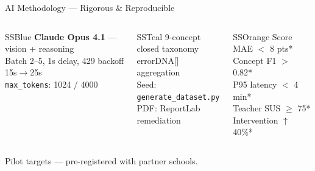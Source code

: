 \documentclass[aspectratio=169,10pt]{beamer}
\begin{document}
\begin{frame}{AI Methodology — Rigorous \& Reproducible}
  \begin{columns}[T]
    \begin{callout}[title={Model}]{SSBlue}
      \footnotesize
      \textbf{Claude Opus 4.1} — vision + reasoning\\
      Batch 2–5, 1s delay, 429 backoff 15s$\rightarrow$25s\\
      \texttt{max\_tokens}: 1024 / 4000
    \end{callout}
    \begin{callout}[title={Data}]{SSTeal}
      \footnotesize
      9-concept closed taxonomy\\
      errorDNA[] aggregation\\
      Seed: \texttt{generate\_dataset.py}\\
      PDF: ReportLab remediation
    \end{callout}
    \begin{callout}[title={Eval (8-wk pilot)}]{SSOrange}
      \footnotesize
      Score MAE $<$ 8 pts*\\
      Concept F1 $>$ 0.82*\\
      P95 latency $<$ 4 min*\\
      Teacher SUS $\geq$ 75*\\
      Intervention $\uparrow$ 40\%*
    \end{callout}
  \end{columns}
  \tiny *Pilot targets — pre-registered with partner schools.
\end{frame}
\end{document}

